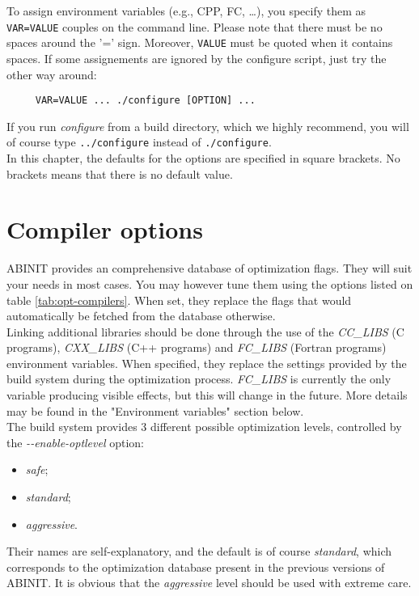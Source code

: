 To assign environment variables (e.g., CPP, FC, \ldots), you specify
them as \texttt{VAR=VALUE} couples on the command line. Please note that
there must be no spaces around the '=' sign. Moreover, \texttt{VALUE}
must be quoted when it contains spaces. If some assignements are ignored
by the configure script, just try the other way around:

\begin{verbatim}
     VAR=VALUE ... ./configure [OPTION] ...
\end{verbatim}

If you run \textit{configure} from a build directory, which we highly recommend, you
will of course type \texttt{../configure} instead of \texttt{./configure}.
\\

In this chapter, the defaults for the options are specified
in square brackets. No brackets means that there is no default value.

\section{Compiler options}

ABINIT provides an comprehensive database of optimization flags. They
will suit your needs in most cases. You may however tune them using the
options listed on table \ref{tab:opt-compilers}. When set, they
replace the flags that would automatically be fetched from the
database otherwise.
\\

Linking additional libraries should be done through the use of the
\textit{CC\_LIBS} (C programs), \textit{CXX\_LIBS} (C++ programs) and
\textit{FC\_LIBS} (Fortran programs) environment variables. When
specified, they replace the settings provided by the build system during
the optimization process. \textit{FC\_LIBS} is currently the only
variable producing visible effects, but this will change in the future.
More details may be found in the "Environment variables" section below.
\\

The build system provides 3 different possible optimization levels,
controlled by the \textit{\hbox{-{-}enable-optlevel}} option:
\begin{itemize}
 \item \textit{safe};
 \item \textit{standard};
 \item \textit{aggressive}.
\end{itemize}
Their names are self-explanatory, and the default is of course
\textit{standard}, which corresponds to the optimization database
present in the previous versions of ABINIT. It is obvious that
the \textit{aggressive} level should be used with extreme care.
\\

